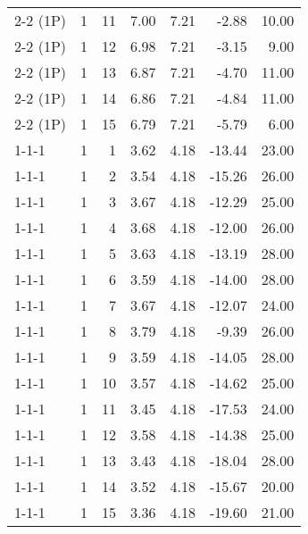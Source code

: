 \begin{tabular}{lrrrrrr}
2-2 (1P) & 1 & 11 & 7.00 & 7.21 & -2.88 & 10.00 \\
2-2 (1P) & 1 & 12 & 6.98 & 7.21 & -3.15 & 9.00 \\
2-2 (1P) & 1 & 13 & 6.87 & 7.21 & -4.70 & 11.00 \\
2-2 (1P) & 1 & 14 & 6.86 & 7.21 & -4.84 & 11.00 \\
2-2 (1P) & 1 & 15 & 6.79 & 7.21 & -5.79 & 6.00 \\
1-1-1 & 1 & 1 & 3.62 & 4.18 & -13.44 & 23.00 \\
1-1-1 & 1 & 2 & 3.54 & 4.18 & -15.26 & 26.00 \\
1-1-1 & 1 & 3 & 3.67 & 4.18 & -12.29 & 25.00 \\
1-1-1 & 1 & 4 & 3.68 & 4.18 & -12.00 & 26.00 \\
1-1-1 & 1 & 5 & 3.63 & 4.18 & -13.19 & 28.00 \\
1-1-1 & 1 & 6 & 3.59 & 4.18 & -14.00 & 28.00 \\
1-1-1 & 1 & 7 & 3.67 & 4.18 & -12.07 & 24.00 \\
1-1-1 & 1 & 8 & 3.79 & 4.18 & -9.39 & 26.00 \\
1-1-1 & 1 & 9 & 3.59 & 4.18 & -14.05 & 28.00 \\
1-1-1 & 1 & 10 & 3.57 & 4.18 & -14.62 & 25.00 \\
1-1-1 & 1 & 11 & 3.45 & 4.18 & -17.53 & 24.00 \\
1-1-1 & 1 & 12 & 3.58 & 4.18 & -14.38 & 25.00 \\
1-1-1 & 1 & 13 & 3.43 & 4.18 & -18.04 & 28.00 \\
1-1-1 & 1 & 14 & 3.52 & 4.18 & -15.67 & 20.00 \\
1-1-1 & 1 & 15 & 3.36 & 4.18 & -19.60 & 21.00 \\
\bottomrule
\end{tabular}
